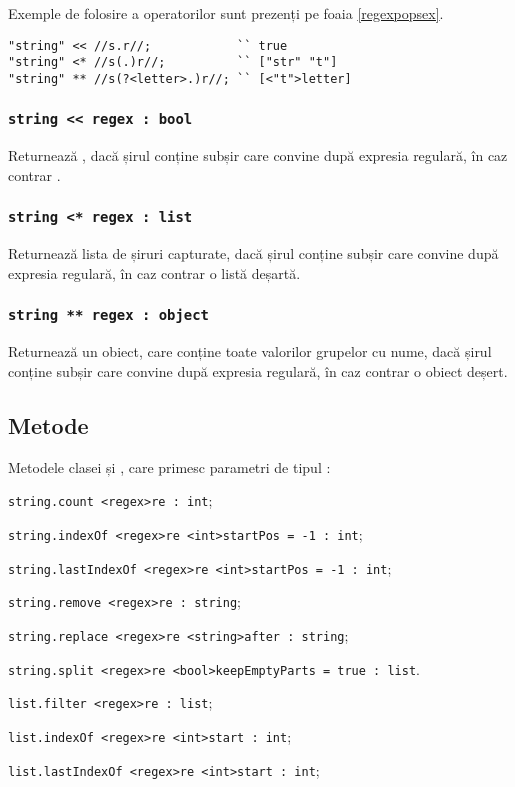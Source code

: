 Exemple de folosire a operatorilor sunt prezenți pe foaia \ref{regexpopsex}.

\begin{lstlisting}[caption=Operații cu expresii regulare, label=regexpopsex]
"string" << //s.r//;            `` true
"string" <* //s(.)r//;          `` ["str" "t"]
"string" ** //s(?<letter>.)r//; `` [<"t">letter]
\end{lstlisting}

\subsubsection{\lstinline|string << regex : bool|}

Returnează \true{}, dacă șirul conține subșir care convine după expresia regulară, în caz contrar \false{}.

\subsubsection{\lstinline|string <* regex : list|}

Returnează lista de șiruri capturate, dacă șirul conține subșir care convine după expresia regulară, în caz contrar o listă deșartă.

\subsubsection{\lstinline|string ** regex : object|}

Returnează un obiect, care conține toate valorilor grupelor cu nume, dacă șirul conține subșir care convine după expresia regulară, în caz contrar o obiect deșert.


\subsection{Metode}

Metodele clasei \str{} și \listtype, care primesc parametri de tipul \regex{}:
\begin{icItems}
\item
	\lstinline|string.count <regex>re : int|;
\item
	\lstinline|string.indexOf <regex>re <int>startPos = -1 : int|;
\item
	\lstinline|string.lastIndexOf <regex>re <int>startPos = -1 : int|;
\item
	\lstinline|string.remove <regex>re : string|;
\item 
	\lstinline|string.replace <regex>re <string>after : string|;
\item
	\lstinline|string.split <regex>re <bool>keepEmptyParts = true : list|.
\item
	\lstinline|list.filter <regex>re : list|;
\item
	\lstinline|list.indexOf <regex>re <int>start : int|;
\item
	\lstinline|list.lastIndexOf <regex>re <int>start : int|;
\end{icItems}

